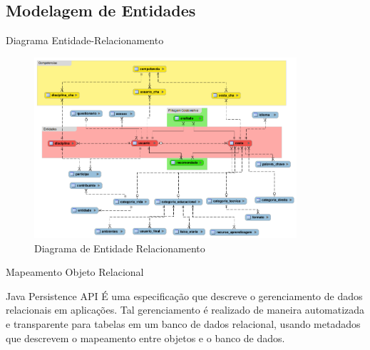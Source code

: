 \documentclass[xcolor=dvipsnames]{beamer}
\begin{document}
\subsection{Modelagem de Entidades}
		\begin{frame}{Diagrama Entidade-Relacionamento}

\begin{figure}[!htb]
	\centering
	\includegraphics[keepaspectratio=true,height=6.7cm]{recomendador-ER.png}
	\caption{Diagrama de Entidade Relacionamento}
	\label{rec-ER}
\end{figure}

		\end{frame}

\begin{frame}{Mapeamento Objeto Relacional}
	

	\begin{block}{Java Persistence API}
É uma especificação que descreve o gerenciamento de dados relacionais em aplicações. Tal gerenciamento é realizado de maneira automatizada e transparente para tabelas em um banco de dados relacional, usando metadados que descrevem o mapeamento entre objetos e o banco de dados.	
	\end{block}		

\end{frame}	
\end{document}
